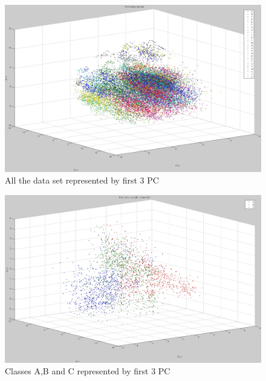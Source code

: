 \begin{figure}[!tbh]
	\centering
	\includegraphics[width=1\textwidth]{figures/pca_points_all_3D}
	\caption{All the data set represented by first 3 PC}
	\label{fig:pca_points_all_3D}
\end{figure}

\begin{figure}[!tbh]
	\centering
	\includegraphics[width=1\textwidth]{figures/pca_points_abc_3D}
	\caption{Classes A,B and C represented by first 3 PC}
	\label{fig:pca_points_abc_3D}
\end{figure}